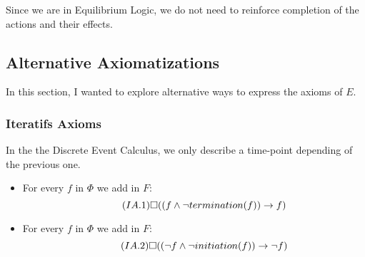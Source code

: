 Since we are in Equilibrium Logic, we do not need to reinforce completion of the actions and their effects.

\subsection{Alternative Axiomatizations}

In this section, I wanted to explore alternative ways to express the axioms of $E$.

\subsubsection{Iteratifs Axioms}\label{sec:iter}

In the the Discrete Event Calculus, we only describe a time-point depending of the previous one.

\begin{itemize}
  \item
    For every $f$ in $\Phi$ we add in $F$:
    \begin{equation}\tag{$IA.1$}
      \square((f \land \neg termination(f)) \rightarrow f)
    \end{equation}
  \item
    For every $f$ in $\Phi$ we add in $F$:
    \begin{equation}\tag{$IA.2$}
      \square((\neg f \land \neg initiation(f)) \rightarrow \neg f)
    \end{equation}
\end{itemize}

